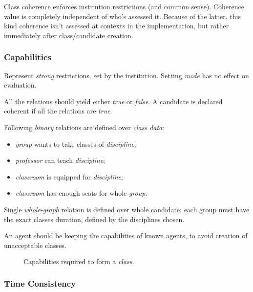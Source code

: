 \documentclass[../ThesisDoc]{subfiles}
\begin{document}
\providecommand{\rootdir}{..}



Class coherence enforces institution restrictions (and common sense).
Coherence value is completely independent of who's assessed it.
Because of the latter, this kind coherence isn't assessed at contexts
in the implementation, but rather immediately after class/candidate creation.

\subsubsection{Capabilities}

Represent \emph{strong} restrictions, set by the institution.
Setting \emph{mode} has no effect on evaluation.

All the relations should yield either \emph{true} or \emph{false}.
A candidate is declared coherent if all the relations are \emph{true}.

Following \emph{binary} relations are defined over \emph{class data}:
\begin{itemize}
  \item \emph{group} wants to take classes of \emph{discipline};
  \item \emph{professor} can teach \emph{discipline};
  \item \emph{classroom} is equipped for \emph{discipline};
  \item \emph{classroom} has enough seats for whole \emph{group}.
\end{itemize}

Single \emph{whole-graph} relation is defined over whole candidate:
each group must have the exact classes duration, defined by the disciplines chosen.

An agent should be keeping the capabilities of known agents, to avoid creation
of unacceptable classes.

\begin{figure}[h]
  \centering
  
  \caption{Capabilities required to form a \emph{class}.}
  \label{fig:capabilities}
\end{figure}


\subsubsection{Time Consistency}
\end{document}
